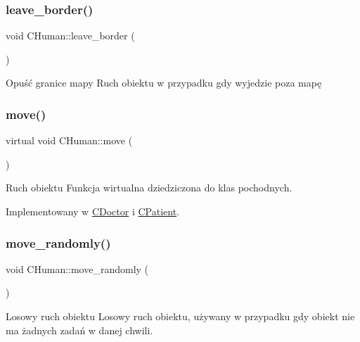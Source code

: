 \subsubsection{\texorpdfstring{leave\+\_\+border()}{leave\_border()}}
{\footnotesize\ttfamily void C\+Human\+::leave\+\_\+border (\begin{DoxyParamCaption}{ }\end{DoxyParamCaption})}



Opuść granice mapy Ruch obiektu w przypadku gdy wyjedzie poza mapę 

\mbox{\label{class_c_human_af0a61dfcb43e2d094ab66b29735c4424}} 
\subsubsection{\texorpdfstring{move()}{move()}}
{\footnotesize\ttfamily virtual void C\+Human\+::move (\begin{DoxyParamCaption}{ }\end{DoxyParamCaption})\hspace{0.3cm}{\ttfamily [pure virtual]}}



Ruch obiektu Funkcja wirtualna dziedziczona do klas pochodnych. 



Implementowany w \mbox{\hyperlink{class_c_doctor_a9fa8e8e952def12024b70231785d07be}{C\+Doctor}} i \mbox{\hyperlink{class_c_patient_ae0af7da80587d2725acbb31923a41cd0}{C\+Patient}}.

\mbox{\label{class_c_human_a3f334a1258957bac162181664212cfcf}} 
\subsubsection{\texorpdfstring{move\+\_\+randomly()}{move\_randomly()}}
{\footnotesize\ttfamily void C\+Human\+::move\+\_\+randomly (\begin{DoxyParamCaption}{ }\end{DoxyParamCaption})}



Losowy ruch obiektu Losowy ruch obiektu, używany w przypadku gdy obiekt nie ma żadnych zadań w danej chwili. 

